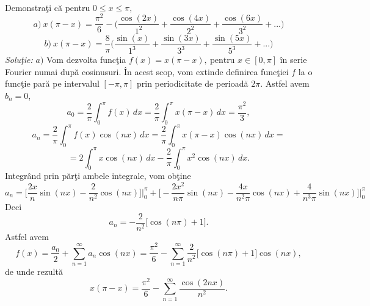 \documentclass[a4paper,openany,12pt]{report}
\begin{document}
\paragraph*{} Demonstra\c ti c\u a pentru $0 \leq x \leq \pi,$
\begin{equation*}
a)\: x(\pi-x)=\frac{\pi^2}{6}-\bigg(\frac{\cos(2x)}{1^2}+\frac{\cos(4x)}{2^2}+\frac{\cos(6x)}{3^2}+...\bigg)
\end{equation*}
\begin{equation*}
b)\: x(\pi-x)=\frac{8}{\pi}\bigg(\frac{\sin(x)}{1^3}+\frac{\sin(3x)}{3^3}+\frac{\sin(5x)}{5^3}+...\bigg)
\end{equation*}
\newline
\textit{Solu\c tie:}
\newline
$a)$ Vom dezvolta func\c tia $f(x)=x(\pi-x), \: \text{pentru } x \in [0,\pi]$ \^ in serie Fourier numai dup\u a cosinusuri. \^ In acest scop, vom extinde definirea func\c tiei $f$ la o func\c tie par\u a pe intervalul $[-\pi, \pi]$ prin periodicitate de perioad\u a $2\pi$. Astfel avem $b_n=0$, 
\begin{equation*}
a_0=\frac{2}{\pi}\int_0^{\pi}f(x)\, dx=\frac{2}{\pi}\int_0^{\pi}x(\pi-x)\, dx =\frac{\pi^2}{3},
\end{equation*}
\begin{equation*}
a_n=\frac{2}{\pi}\int_0^{\pi}f(x)\cos(nx)\, dx=\frac{2}{\pi}\int_0^{\pi}x(\pi-x) \cos(nx)\, dx =
\end{equation*}
\begin{equation*}
=2\int_0^{\pi}x\cos(nx)\, dx - \frac{2}{\pi}\int_0^{\pi}x^2\cos(nx)\, dx.
\end{equation*}
Integr\^ and prin p\u ar\c ti ambele integrale, vom ob\c tine
\begin{equation*}
a_n=\Big[\frac{2x}{n}\sin(nx)-\frac{2}{n^2}\cos(nx)\Big]\bigg|_{0}^{\pi}+\Big[-\frac{2x^2}{n\pi}\sin(nx)-\frac{4x}{n^2\pi}\cos(nx)+\frac{4}{n^3\pi}\sin(nx)\Big]\bigg|_{0}^{\pi}
\end{equation*}
Deci 
\begin{equation*}
a_n=-\frac{2}{n^2}\Big[\cos(n\pi)+1\Big].
\end{equation*}
Astfel avem
\begin{equation*}
f(x)=\frac{a_0}{2}+\sum_{n=1}^\infty a_n \cos(nx)=\frac{\pi^2}{6}-\sum_{n=1}^{\infty}\frac{2}{n^2}\Big[\cos(n\pi)+1\Big]\cos(nx),
\end{equation*}
de unde rezult\u a
\begin{equation*}
x(\pi-x)=\frac{\pi^2}{6}-\sum_{n=1}^{\infty}\frac{\cos(2nx)}{n^2}.
\end{equation*}
\end{document}
